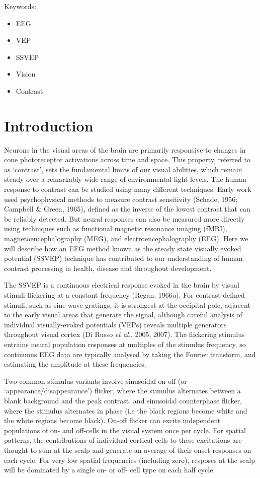 \documentclass[
  letterpaper,
  DIV=11,
  numbers=noendperiod]{scrartcl}
\providecommand{\tightlist}{%
  \setlength{\itemsep}{0pt}\setlength{\parskip}{0pt}}\usepackage{longtable,booktabs,array}
\begin{document}
Keywords:

\begin{itemize}
\tightlist
\item
  EEG
\item
  VEP
\item
  SSVEP
\item
  Vision
\item
  Contrast
\end{itemize}

\newpage{}

\section{Introduction}\label{introduction}

Neurons in the visual areas of the brain are primarily responsive to
changes in cone photoreceptor activations across time and space. This
property, referred to as `contrast', sets the fundamental limits of our
visual abilities, which remain steady over a remarkably wide range of
environmental light levels. The human response to contrast can be
studied using many different techniques. Early work used psychophysical
methods to measure contrast sensitivity (Schade, 1956; Campbell \&
Green, 1965), defined as the inverse of the lowest contrast that can be
reliably detected. But neural responses can also be measured more
directly using techniques such as functional magnetic resonance imaging
(fMRI), magnetoencephalography (MEG), and electroencephalography (EEG).
Here we will describe how an EEG method known as the steady state
visually evoked potential (SSVEP) technique has contributed to our
understanding of human contrast processing in health, disease and
throughout development.

The SSVEP is a continuous electrical response evoked in the brain by
visual stimuli flickering at a constant frequency (Regan, 1966\emph{a}).
For contrast-defined stimuli, such as sine-wave gratings, it is
strongest at the occipital pole, adjacent to the early visual areas that
generate the signal, although careful analysis of individual
visually-evoked potentials (VEPs) reveals multiple generators throughout
visual cortex (Di Russo \emph{et al.}, 2005, 2007). The flickering
stimulus entrains neural population responses at multiples of the
stimulus frequency, so continuous EEG data are typically analysed by
taking the Fourier transform, and estimating the amplitude at these
frequencies.

Two common stimulus variants involve sinusoidal on-off (or
`appearance/disappearance') flicker, where the stimulus alternates
between a blank background and the peak contrast, and sinusoidal
counterphase flicker, where the stimulus alternates in phase (i.e the
black regions become white and the white regions become black). On-off
flicker can excite independent populations of on- and off-cells in the
visual system once per cycle. For spatial patterns, the contributions of
individual cortical cells to these excitations are thought to sum at the
scalp and generate an average of their onset responses on each cycle.
For very low spatial frequencies (including zero), resposes at the scalp
will be dominated by a single on- or off- cell type on each half cycle.
\end{document}
